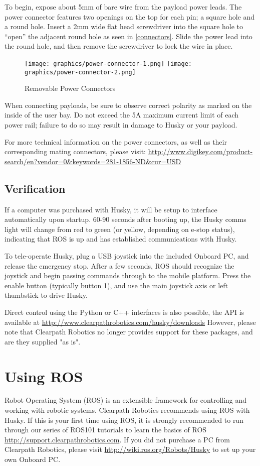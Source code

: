 \documentclass[]{clearpath-latex/clearpath-manual}
\begin{document}
To begin, expose about 5mm of bare wire from the payload power leads. The power connector features two
openings on the top for each pin; a square hole and a round hole. Insert a 2mm wide flat head screwdriver
into the square hole to “open” the adjacent round hole as seen in \autoref{connectors}. Slide the power lead into the round hole, and then
remove the screwdriver to lock the wire in place.

\begin{figure}[h]
	\centering
	\texttt{[image: graphics/power-connector-1.png]}
	\texttt{[image: graphics/power-connector-2.png]}
	\caption{Removable Power Connectors}
	\label{connectors}
\end{figure}

When connecting payloads, be sure to observe correct polarity as marked on the inside of the user bay.
Do not exceed the 5A maximum current limit of each power rail; failure to do so may result in damage
to Husky or your payload.

For more technical information on the power connectors, as well as their corresponding mating connectors, please visit: \url{http://www.digikey.com/product-search/en?vendor=0&keywords=281-1856-ND&cur=USD}

\subsection{Verification}
If a computer was purchased with Husky, it will be setup to interface automatically upon startup.
60-90 seconds after booting up, the Husky comms light will change from red to green
(or yellow, depending on e-stop status), indicating that ROS is up and has established communications with Husky.

To tele-operate Husky, plug a USB joystick into the included Onboard PC, and release the emergency stop.
After a few seconds, ROS should recognize the joystick and begin passing commands through to the mobile platform.
Press the enable button (typically button 1), and use the main joystick axis or left thumbstick to drive Husky.

Direct control using the Python or C++ interfaces is also possible, the API is available at
\url{http://www.clearpathrobotics.com/husky/downloads} However, please note that Clearpath Robotics no
longer provides support for these packages, and are they supplied "as is".

\section{Using ROS}
Robot Operating System (ROS) is an extensible framework for controlling and working with robotic systems.
Clearpath Robotics recommends using ROS with Husky. If this is your first time using ROS, it is strongly
recommended to run through our series of ROS101 tutorials to learn the basics of ROS
\url{http://support.clearpathrobotics.com}. If you did not purchase a PC from Clearpath Robotics, please visit \url{http://wiki.ros.org/Robots/Husky}
to set up your own Onboard PC.
\end{document}
